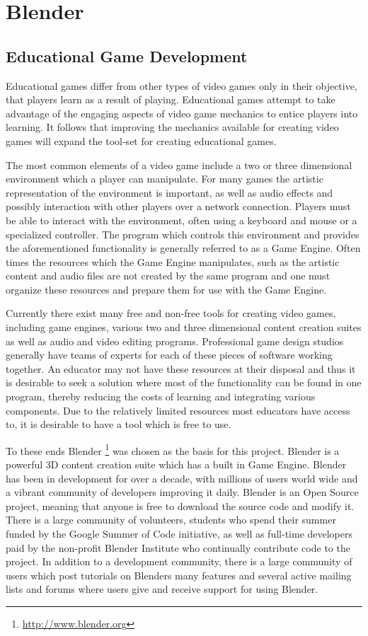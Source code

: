 \chapter{Blender}
\label{chapter:blender}

\section{Educational Game Development}
Educational games differ from other types of video games only in their
objective, that players learn as a result of playing. Educational games attempt
to take advantage of the engaging aspects of video game mechanics to entice
players into learning. It follows that improving the mechanics available for
creating video games will expand the tool-set for creating educational games.


The most common elements of a video game include a two or three dimensional
environment which a player can manipulate. For many games the artistic
representation of the environment is important, as well as audio effects and
possibly interaction with other players over a network connection. Players must
be able to interact with the environment, often using a keyboard and mouse or a
specialized controller. The program which controls this environment and
provides the aforementioned functionality is generally referred to as a Game
Engine. Often times the resources which the Game Engine manipulates, such as
the artistic content and audio files are not created by the same program and
one must organize these resources and prepare them for use with the Game
Engine.


Currently there exist many free and non-free tools for creating video games,
including game engines, various two and three dimensional content creation
suites as well as audio and video editing programs. Professional game design
studios generally have teams of experts for each of these pieces of software
working together. An educator may not have these resources at their disposal and
thus it is desirable to seek a solution where most of the functionality can be
found in one program, thereby reducing the costs of learning and integrating
various components. Due to the relatively limited resources most educators have
access to, it is desirable to have a tool which is free to use. 


To these ends Blender \footnote{\url{http://www.blender.org}} was chosen as the basis for this project.
Blender is a powerful 3D content creation suite which has a built in Game
Engine. Blender has been in development for over a decade, with millions of
users world wide and a vibrant community of developers improving it daily.
Blender is an Open Source project, meaning that anyone is free to download the
source code and modify it. There is a large community of volunteers, students
who spend their summer funded by the Google Summer of Code initiative, as well
as full-time developers paid by the non-profit Blender Institute who
continually contribute code to the project. In addition to a development
community, there is a large community of users which post tutorials on Blenders
many features and several active mailing lists and forums where users give and
receive support for using Blender.



